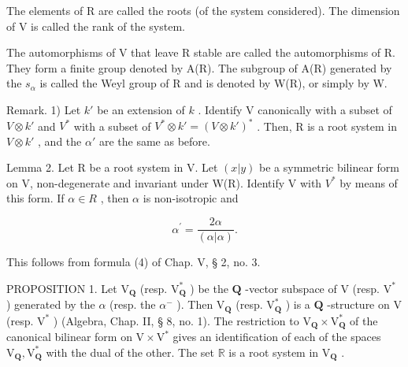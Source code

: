 The elements of R are called the roots (of the system considered). The dimension of V is called the rank of the system.

The automorphisms of V that leave R stable are called the automorphisms of R. They form a finite group denoted by A(R). The subgroup of A(R) generated by the \(s_{\alpha}\) is called the Weyl group of R and is denoted by W(R), or simply by W.

Remark. 1) Let \(k'\) be an extension of \(k\) . Identify V canonically with a subset of \(V \otimes k'\) and \(V^*\) with a subset of \(V^* \otimes k' = (V \otimes k')^*\) . Then, R is a root system in \(V \otimes k'\) , and the \(\alpha'\) are the same as before.

Lemma 2. Let R be a root system in V. Let \((x|y)\) be a symmetric bilinear form on V, non-degenerate and invariant under W(R). Identify V with \(V^{*}\) by means of this form. If \(\alpha \in R\) , then \(\alpha\) is non-isotropic and

\[
\alpha^ {\prime} = \frac {2 \alpha}{(\alpha | \alpha)}.
\]

This follows from formula (4) of Chap. V, § 2, no. 3.

PROPOSITION 1. Let \(\mathrm{V}_{\mathbf{Q}}\) (resp. \(\mathrm{V}_{\mathbf{Q}}^{*}\) ) be the \(\mathbf{Q}\) -vector subspace of \(\mathrm{V}\) (resp. \(\mathrm{V}^{*}\) ) generated by the \(\alpha\) (resp. the \(\alpha^{-}\) ). Then \(\mathrm{V}_{\mathbf{Q}}\) (resp. \(\mathrm{V}_{\mathbf{Q}}^{*}\) ) is a \(\mathbf{Q}\) -structure on \(\mathrm{V}\) (resp. \(\mathrm{V}^{*}\) ) (Algebra, Chap. II, § 8, no. 1). The restriction to \(\mathrm{V}_{\mathbf{Q}} \times \mathrm{V}_{\mathbf{Q}}^{*}\) of the canonical bilinear form on \(\mathrm{V} \times \mathrm{V}^{*}\) gives an identification of each of the spaces \(\mathrm{V}_{\mathbf{Q}}, \mathrm{V}_{\mathbf{Q}}^{*}\) with the dual of the other. The set \(\mathbb{R}\) is a root system in \(\mathrm{V}_{\mathbf{Q}}\) .

